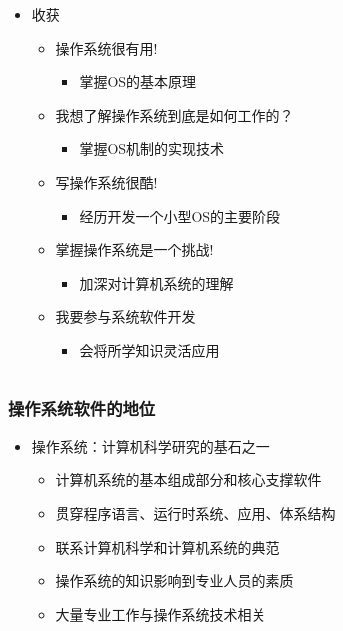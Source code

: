 \documentclass[UTF8]{ctexbeamer}
\begin{document}
\begin{frame}
\begin{columns}[t]
    \begin{column}{0.5\textwidth}
        \begin{itemize}
            \item 收获
        \begin{itemize}
            \item 操作系统很有用!
                \begin{itemize}
                    \item 掌握OS的基本原理
                \end{itemize}
            \item 我想了解操作系统到底是如何工作的？
                \begin{itemize}
                    \item 掌握OS机制的实现技术
                \end{itemize}
            \item 写操作系统很酷!
                \begin{itemize}
                    \item 经历开发一个小型OS的主要阶段
                \end{itemize}
            \item 掌握操作系统是一个挑战!
                \begin{itemize}
                    \item 加深对计算机系统的理解
                \end{itemize}
            \item 我要参与系统软件开发
                \begin{itemize}
                    \item 会将所学知识灵活应用
                \end{itemize}
            \end{itemize}
        \end{itemize}
        \end{column}
    \end{columns}
    
    \end{frame}
    
\begin{frame}
    \frametitle{操作系统软件的地位}
    \begin{itemize}
        \item 操作系统：计算机科学研究的基石之一
        \begin{itemize}
            \item 计算机系统的基本组成部分和核心支撑软件
            \item 贯穿程序语言、运行时系统、应用、体系结构
            \item 联系计算机科学和计算机系统的典范
            \item 操作系统的知识影响到专业人员的素质
            \item 大量专业工作与操作系统技术相关
        \end{itemize}
    \end{itemize}
\end{frame}
\end{document}

